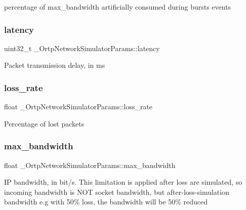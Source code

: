 percentage of max\+\_\+bandwidth artificially consumed during bursts events \mbox{\label{struct__OrtpNetworkSimulatorParams_aa03ec64c497e75e4fba1fe7ea4964dc5}} 
\subsubsection{latency}
{\footnotesize\ttfamily uint32\+\_\+t \+\_\+\+Ortp\+Network\+Simulator\+Params\+::latency}

Packet transmission delay, in ms \mbox{\label{struct__OrtpNetworkSimulatorParams_a099c1040667fe972f9ac3ea3fcf83ade}} 
\subsubsection{loss\+\_\+rate}
{\footnotesize\ttfamily float \+\_\+\+Ortp\+Network\+Simulator\+Params\+::loss\+\_\+rate}

Percentage of lost packets \mbox{\label{struct__OrtpNetworkSimulatorParams_a159dcf726597931ad1f830497be22626}} 
\subsubsection{max\+\_\+bandwidth}
{\footnotesize\ttfamily float \+\_\+\+Ortp\+Network\+Simulator\+Params\+::max\+\_\+bandwidth}

IP bandwidth, in bit/s. This limitation is applied after loss are simulated, so incoming bandwidth is N\+OT socket bandwidth, but after-\/loss-\/simulation bandwidth e.\+g with 50\% loss, the bandwidth will be 50\% reduced \mbox{\label{struct__OrtpNetworkSimulatorParams_acbf172e79d8c2efa69d2e91ddb44cc30}} 
